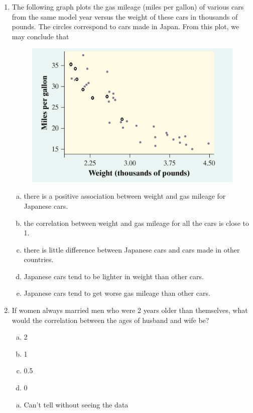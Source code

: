 \documentclass[a4paper,12pt,twoside]{book}
\begin{document}
\begin{enumerate}
    
\item The following graph plots the gas mileage (miles per gallon) of various cars from the same model year versus the weight of these cars in thousands of pounds. The circles correspond to cars made in Japan. From this plot, we may conclude that
    \begin{figure}[H]
        \centering
        \includegraphics[scale=0.3]{figure0203}
    \end{figure}
    \begin{enumerate}[(a)]
        \item there is a positive association between weight and gas mileage for Japanese cars.
        \item the correlation between weight and gas mileage for all the cars is close to 1.
        \item there is little difference between Japanese cars and cars made in other countries.
        \item Japanese cars tend to be lighter in weight than other cars.
        \item Japanese cars tend to get worse gas mileage than other cars.
    \end{enumerate}
    \vspace{0.3cm}

\item If women always married men who were 2 years older than themselves, what would the correlation between the ages of husband and wife be?

     \begin{multicols}{4}
     \begin{enumerate}[(a)]
         \item 2
         \item 1
         \item 0.5
         \item 0
     \end{enumerate}
     \end{multicols}
     \begin{enumerate}[(e)]
         \item Can’t tell without seeing the data
     \end{enumerate}
     \vspace{0.3cm}
     

\end{enumerate}
\end{document}
